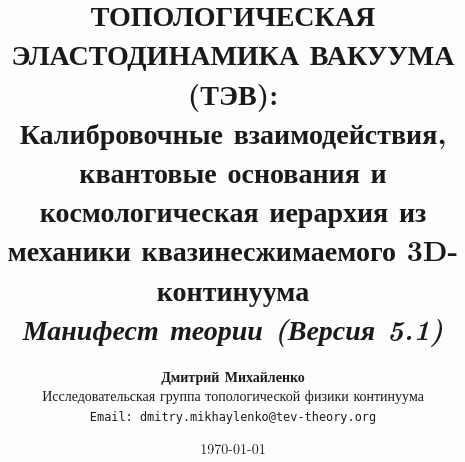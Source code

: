 \documentclass[12pt,a4paper]{article}
\theoremstyle{definition}
\theoremstyle{remark}
\begin{document}
	
	\title{\textbf{\Large ТОПОЛОГИЧЕСКАЯ ЭЛАСТОДИНАМИКА ВАКУУМА (ТЭВ):}\\[2mm]
		\large Калибровочные взаимодействия, квантовые основания и космологическая иерархия из механики квазинесжимаемого 3D-континуума\\[2mm]
		\normalsize \textit{Манифест теории (Версия 5.1)}}
	
	\author{\textbf{Дмитрий Михайленко}\\[1mm]
		\small Исследовательская группа топологической физики континуума\\
		\small \texttt{Email: dmitry.mikhaylenko@tev-theory.org}}
	
	\date{\today}
	
	\maketitle
	
\end{document}
